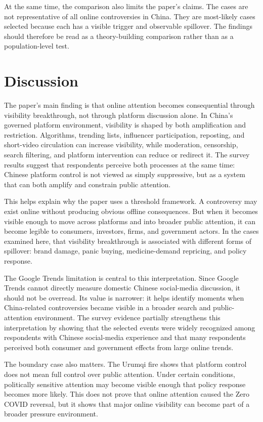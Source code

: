 \documentclass[conference]{IEEEtran}
\begin{document}
At the same time, the comparison also limits the paper's claims. The cases are not representative of all online controversies in China. They are most-likely cases selected because each has a visible trigger and observable spillover. The findings should therefore be read as a theory-building comparison rather than as a population-level test.
\FloatBarrier

\section{Discussion}
The paper's main finding is that online attention becomes consequential through visibility breakthrough, not through platform discussion alone. In China's governed platform environment, visibility is shaped by both amplification and restriction. Algorithms, trending lists, influencer participation, reposting, and short-video circulation can increase visibility, while moderation, censorship, search filtering, and platform intervention can reduce or redirect it. The survey results suggest that respondents perceive both processes at the same time: Chinese platform control is not viewed as simply suppressive, but as a system that can both amplify and constrain public attention.

This helps explain why the paper uses a threshold framework. A controversy may exist online without producing obvious offline consequences. But when it becomes visible enough to move across platforms and into broader public attention, it can become legible to consumers, investors, firms, and government actors. In the cases examined here, that visibility breakthrough is associated with different forms of spillover: brand damage, panic buying, medicine-demand repricing, and policy response.

The Google Trends limitation is central to this interpretation. Since Google Trends cannot directly measure domestic Chinese social-media discussion, it should not be overread. Its value is narrower: it helps identify moments when China-related controversies became visible in a broader search and public-attention environment. The survey evidence partially strengthens this interpretation by showing that the selected events were widely recognized among respondents with Chinese social-media experience and that many respondents perceived both consumer and government effects from large online trends.

The boundary case also matters. The Urumqi fire shows that platform control does not mean full control over public attention. Under certain conditions, politically sensitive attention may become visible enough that policy response becomes more likely. This does not prove that online attention caused the Zero COVID reversal, but it shows that major online visibility can become part of a broader pressure environment.
\end{document}
